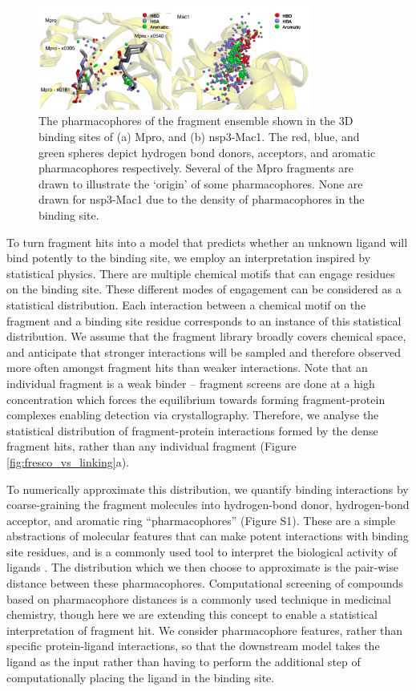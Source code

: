 \begin{figure}[th]
    \centering
    \includegraphics[width=0.8\textwidth]{Chapters/Fresco/Figs/pharmacophores.png}
    \caption{The pharmacophores of the fragment ensemble shown in the 3D binding sites of (a) Mpro, and (b) nsp3-Mac1. The red, blue, and green spheres depict hydrogen bond donors, acceptors, and aromatic pharmacophores respectively. Several of the Mpro fragments are drawn to illustrate the ‘origin’ of some pharmacophores. None are drawn for nsp3-Mac1 due to the density of pharmacophores in the binding site.}
    \label{fig:pharmacophores}
\end{figure}


To turn fragment hits into a model that predicts whether an unknown ligand will bind potently to the binding site, we employ an interpretation inspired by statistical physics. There are multiple chemical motifs that can engage residues on the binding site. These different modes of engagement can be considered as a statistical distribution. Each interaction between a chemical motif on the fragment and a binding site residue corresponds to an instance of this statistical distribution. We assume that the fragment library broadly covers chemical space, and anticipate that stronger interactions will be sampled and therefore observed more often amongst fragment hits than weaker interactions. Note that an individual fragment is a weak binder -- fragment screens are done at a high concentration which forces the equilibrium towards forming fragment-protein complexes enabling detection via crystallography. Therefore, we analyse the statistical distribution of fragment-protein interactions formed by the dense fragment hits, rather than any individual fragment (Figure \ref{fig:fresco_vs_linking}a).

To numerically approximate this distribution, we quantify binding interactions by coarse-graining the fragment molecules into hydrogen-bond donor, hydrogen-bond acceptor, and aromatic ring ``pharmacophores'' (Figure S1). These are a simple abstractions of molecular features that can make potent interactions with binding site residues, and is a commonly used tool to interpret the biological activity of ligands \cite{Kaserer2015PharmacophoreReview}. The distribution which we then choose to approximate is the pair-wise distance between these pharmacophores. Computational screening of compounds based on pharmacophore distances is a commonly used technique in medicinal chemistry, though here we are extending this concept to enable a statistical interpretation of fragment hit. We consider pharmacophore features, rather than specific protein-ligand interactions, so that the downstream model takes the ligand as the input rather than having to perform the additional step of computationally placing the ligand in the binding site. 

